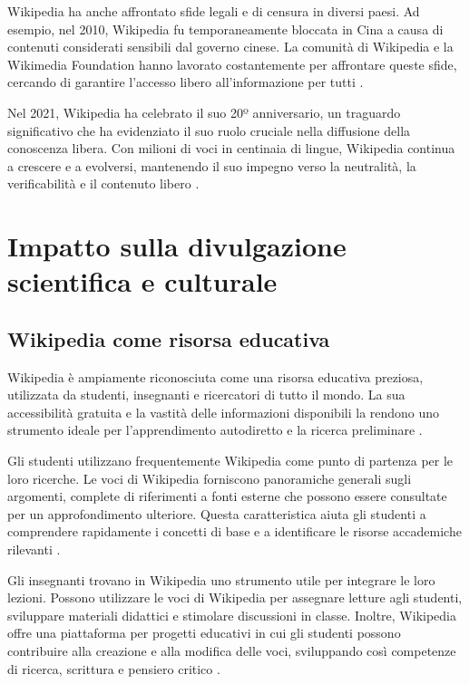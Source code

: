 \documentclass[12pt,a4paper]{report}
\begin{document}
Wikipedia ha anche affrontato sfide legali e di censura in diversi paesi. Ad esempio, nel 2010, Wikipedia fu temporaneamente bloccata in Cina a causa di contenuti considerati sensibili dal governo cinese. La comunità di Wikipedia e la Wikimedia Foundation hanno lavorato costantemente per affrontare queste sfide, cercando di garantire l'accesso libero all'informazione per tutti \cite{jemielniak2014wikipedia}.

Nel 2021, Wikipedia ha celebrato il suo 20º anniversario, un traguardo significativo che ha evidenziato il suo ruolo cruciale nella diffusione della conoscenza libera. Con milioni di voci in centinaia di lingue, Wikipedia continua a crescere e a evolversi, mantenendo il suo impegno verso la neutralità, la verificabilità e il contenuto libero \cite{reagle2010good}.

\section{Impatto sulla divulgazione scientifica e culturale}

\subsection{Wikipedia come risorsa educativa}

Wikipedia è ampiamente riconosciuta come una risorsa educativa preziosa, utilizzata da studenti, insegnanti e ricercatori di tutto il mondo. La sua accessibilità gratuita e la vastità delle informazioni disponibili la rendono uno strumento ideale per l'apprendimento autodiretto e la ricerca preliminare \cite{reagle2010good}.

Gli studenti utilizzano frequentemente Wikipedia come punto di partenza per le loro ricerche. Le voci di Wikipedia forniscono panoramiche generali sugli argomenti, complete di riferimenti a fonti esterne che possono essere consultate per un approfondimento ulteriore. Questa caratteristica aiuta gli studenti a comprendere rapidamente i concetti di base e a identificare le risorse accademiche rilevanti \cite{denning2005wikipedia}.

Gli insegnanti trovano in Wikipedia uno strumento utile per integrare le loro lezioni. Possono utilizzare le voci di Wikipedia per assegnare letture agli studenti, sviluppare materiali didattici e stimolare discussioni in classe. Inoltre, Wikipedia offre una piattaforma per progetti educativi in cui gli studenti possono contribuire alla creazione e alla modifica delle voci, sviluppando così competenze di ricerca, scrittura e pensiero critico \cite{jemielniak2014wikipedia}.
\end{document}
